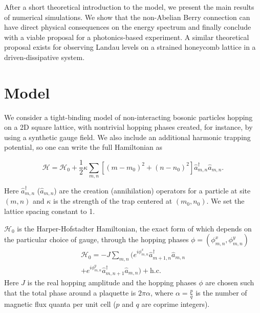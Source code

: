 \documentclass[twocolumn, 10pt, aps, superscriptaddress, floatfix, showpacs, pra, citeautoscript]{revtex4-1}
\newcommand{\co}[2]{#2}
\renewcommand{\paragraph}{\co}
\begin{document}
\paragraph{Summary of the manuscript}
After a short theoretical introduction to the model, we present the
main results of numerical simulations. We show that the non-Abelian
Berry connection can have direct physical consequences on the energy
spectrum and finally conclude with a viable proposal for a
photonics-based experiment. A similar theoretical proposal exists for
observing Landau levels on a strained honeycomb lattice in a
driven-dissipative system.~\cite{salerno2015graphene}


\section{Model}
\label{sec:model}

We consider a tight-binding model of non-interacting bosonic particles
hopping on a 2D square lattice, with nontrivial hopping phases
created, for instance, by using a synthetic gauge field. We also
include an additional harmonic trapping potential, so one can write
the full Hamiltonian as

\begin{equation}\label{eq:model}
\mathcal{H}=\mathcal{H}_0+\frac{1}{2}\kappa
\sum_{m,n}\left[(m-m_0)^{2}+(n-n_0)^{2}\right]\hat{a}_{m,n}^{\dagger}\hat{a}_{m,n}.
\end{equation}

Here $\hat{a}_{m,n}^{\dagger}$ ($\hat{a}_{m,n}$) are the creation
(annihilation) operators for a particle at site $(m,n)$ and $\kappa$ is
the strength of the trap centered at $(m_0, n_0)$. We set the lattice
spacing constant to 1.

$\mathcal{H}_0$ is the Harper-Hofstadter Hamiltonian, the exact form
of which depends on the particular choice of gauge, through the
hopping phases $\phi = (\phi_{m,n}^x, \phi_{m,n}^y)$
%
\begin{multline}\label{eq:hh_hamiltonian}
\mathcal{H}_0=-J\sum_{m,n}(e^{i \phi_{m,n}^x}\hat{a}_{m+1,n}^{\dagger}\hat{a}_{m,n}\\
+e^{i \phi_{m,n}^y}\hat{a}_{m,n+1}^{\dagger}\hat{a}_{m,n}) + \text{h.c.}
\end{multline}
Here $J$ is the real hopping amplitude and the hopping phases $\phi$
are chosen such that the total phase around a plaquette is
$2\pi\alpha$, where $\alpha = \frac{p}{q}$ is the number of magnetic
flux quanta per unit cell ($p$ and $q$ are coprime integers). 
\end{document}
